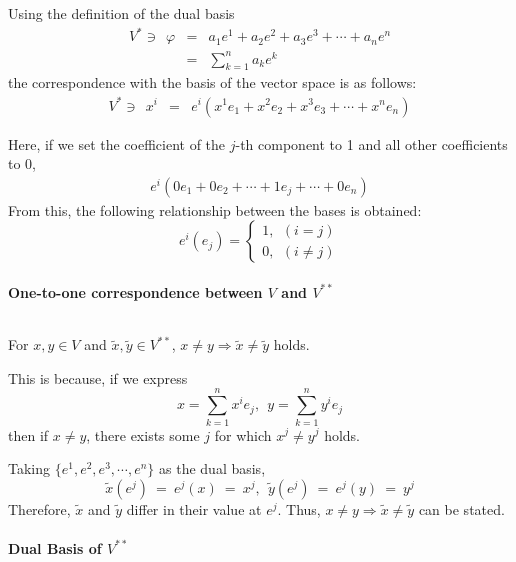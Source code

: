 \documentclass[uplatex,a4j,12pt,dvipdfmx]{jsarticle}
\begin{document}
Using the definition of the dual basis
\[
	\begin{array}{rcl}
		V^{*} \ni \ \ \varphi
		 & = &
		a_{1} e^{1} + a_{2} e^{2} + a_{3} e^{3} + \cdots + a_{n} e^{n}
		\\
		 & = &
		\displaystyle \sum_{k=1}^{n} a_{k} e^{k}
	\end{array}
\]
the correspondence with the basis of the vector space is as follows:
\[
	\begin{array}{rcl}
		V^{*} \ni \ \ x^{i}
		 & = &
		e^{i} (x^{1} e_{1} + x^{2} e_{2} + x^{3} e_{3} + \cdots + x^{n} e_{n})
	\end{array}
\]

Here, if we set the coefficient of the $j$-th component to 1 and all other coefficients to 0,
\[
	\begin{array}{rcl}
		e^{i} (0 e_{1} + 0 e_{2}  + \cdots + 1 e_{j} + \cdots + 0 e_{n})
	\end{array}
\]
From this, the following relationship between the bases is obtained:
\[
	e^{i}(e_{j})
	=
	\left\{
	\begin{array}{l}
		1, \ \ (i=j) \\
		0, \ \ (i \neq j)
	\end{array}
	\right.
\]

\paragraph{One-to-one correspondence between $V$ and $V^{**}$}

${}$

For $x,y \in V$ and $\tilde{x}, \tilde{y} \in V^{**}$,
$x \neq y \Rightarrow \tilde{x} \neq \tilde{y}$ holds.

This is because,
if we express
$$
	x = \sum_{k=1}^{n} x^{i} e_{j} , \ \
	y = \sum_{k=1}^{n} y^{i} e_{j}
$$
then if $x \neq y$, there exists some $j$ for which
$x^{j} \neq y^{j}$ holds.

Taking
$\{ e^{1}, e^{2}, e^{3}, \cdots , e^{n} \}$
as the dual basis,
$$
	\tilde{x}(e^{j})
	\ = \
	e^{j}(x)
	\ = \
	x^{j}
	, \ \
	\tilde{y}(e^{j})
	\ = \
	e^{j}(y)
	\ = \
	y^{j}
$$
Therefore,
$\tilde{x}$ and $\tilde{y}$ differ in their value at $e^{j}$.
Thus,
$x \neq y \Rightarrow \tilde{x} \neq \tilde{y}$
can be stated.

\paragraph{Dual Basis of $V^{**}$}

${}$
\end{document}
